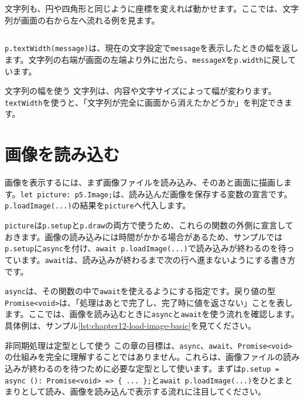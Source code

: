 文字列も、円や四角形と同じように座標を変えれば動かせます。ここでは、文字列が画面の右から左へ流れる例を見ます。

\begin{listing}[htbp]
\inputminted{ts}{typescript-p5/listings/chapter12/moving-text.ts}
\caption{\texttt{textWidth}を使って文字列を画面外で戻す（\texttt{chapter12/moving-text.ts}）}
\label{lst:chapter12-moving-text}
\end{listing}

\texttt{p.textWidth(message)}は、現在の文字設定で\texttt{message}を表示したときの幅を返します。文字列の右端が画面の左端より外に出たら、\texttt{messageX}を\texttt{p.width}に戻しています。

\begin{pointbox}{文字列の幅を使う}
文字列は、内容や文字サイズによって幅が変わります。\texttt{textWidth}を使うと、「文字列が完全に画面から消えたかどうか」を判定できます。
\end{pointbox}

\section{画像を読み込む}

画像を表示するには、まず画像ファイルを読み込み、そのあと画面に描画します。\texttt{let picture: p5.Image;}は、読み込んだ画像を保存する変数の宣言です。\texttt{p.loadImage(...)}の結果を\texttt{picture}へ代入します。

\texttt{picture}は\texttt{p.setup}と\texttt{p.draw}の両方で使うため、これらの関数の外側に宣言しておきます。画像の読み込みには時間がかかる場合があるため、サンプルでは\texttt{p.setup}に\texttt{async}を付け、\texttt{await p.loadImage(...)}で読み込みが終わるのを待っています。\texttt{await}は、読み込みが終わるまで次の行へ進まないようにする書き方です。

\texttt{async}は、その関数の中で\texttt{await}を使えるようにする指定です。戻り値の型\texttt{Promise<void>}は、「処理はあとで完了し、完了時に値を返さない」ことを表します。ここでは、画像を読み込むときに\texttt{async}と\texttt{await}を使う流れを確認します。具体例は、サンプル\ref{lst:chapter12-load-image-basic}を見てください。

\begin{pointbox}{非同期処理は定型として使う}
この章の目標は、\texttt{async}、\texttt{await}、\texttt{Promise<void>}の仕組みを完全に理解することではありません。これらは、画像ファイルの読み込みが終わるのを待つために必要な定型として使います。まずは\texttt{p.setup = async (): Promise<void> => \{ ... \};}と\texttt{await p.loadImage(...)}をひとまとまりとして読み、画像を読み込んで表示する流れに注目してください。
\end{pointbox}

